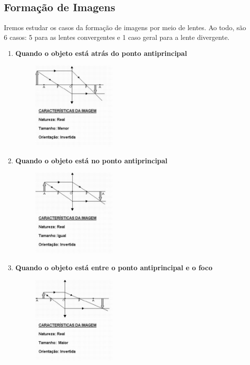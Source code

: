 \documentclass[12pt]{extarticle}
\newcommand{\<}{\langle}
\renewcommand{\>}{\rangle}
\theoremstyle{definition}
\begin{document}
\subsection{Formação de Imagens}
Iremos estudar os casos da formação de imagens por meio de lentes. Ao todo, são 6 casos: 5 para as lentes convergentes e 1 caso geral para a lente divergente.
\begin{enumerate}
    \item \textbf{Quando o objeto está atrás do ponto antiprincipal}
    \begin{figure}[H]
        \centering
        \includegraphics[width=0.4\textwidth]{caso_conv_atras_anti.jpg}
    \end{figure}
    
    \item \textbf{Quando o objeto está no ponto antiprincipal}
    \begin{figure}[H]
        \centering
        \includegraphics[width=0.4\textwidth]{caso_conv_no_anti.jpg}
    \end{figure}
    
    \item \textbf{Quando o objeto está entre o ponto antiprincipal e o foco}
    \begin{figure}[H]
        \centering
        \includegraphics[width=0.4\textwidth]{caso_conv_entre_anti_foco.jpg}
    \end{figure}
    

\end{enumerate}
\end{document}
